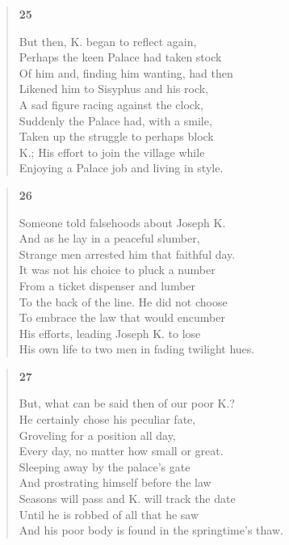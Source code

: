 \documentclass{article}
\begin{document}
\begin{verse}
  \begin{center}
    \textbf{25} \\
  \end{center}
  But then, K. began to reflect again, \\
  Perhaps the keen Palace had taken stock \\
  Of him and, finding him wanting, had then \\
  Likened him to Sisyphus and his rock, \\
  A sad figure racing against the clock, \\
  Suddenly the Palace had, with a smile, \\
  Taken up the struggle to perhaps block \\
  K.; His effort to join the village while \\
  Enjoying a Palace job and living in style.
\end{verse}

\begin{verse}
  \begin{center}
    \textbf{26} \\
  \end{center}
  Someone told falsehoods about Joseph K. \\
  And as he lay in a peaceful slumber, \\
  Strange men arrested him that faithful day. \\
  It was not his choice to pluck a number \\
  From a ticket dispenser and lumber \\
  To the back of the line. He did not choose \\
  To embrace the law that would encumber \\
  His efforts, leading Joseph K. to lose \\
  His own life to two men in fading twilight hues.
\end{verse}

\begin{verse}
  \begin{center}
    \textbf{27} \\
  \end{center}
  But, what can be said then of our poor K.? \\
  He certainly chose his peculiar fate, \\
  Groveling for a position all day, \\
  Every day, no matter how small or great. \\
  Sleeping away by the palace's gate \\
  And prostrating himself before the law \\
  Seasons will pass and K. will track the date \\
  Until he is robbed of all that he saw \\
  And his poor body is found in the springtime's thaw.
\end{verse}
\end{document}

